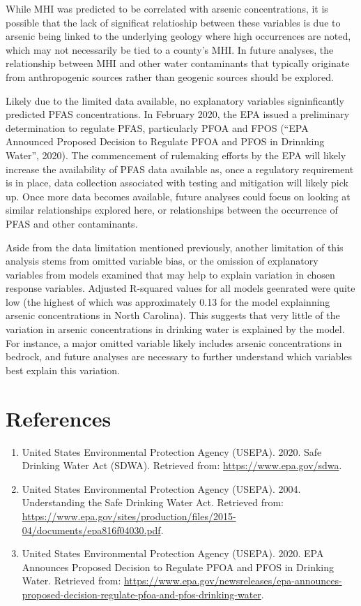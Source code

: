 \documentclass[12pt,]{article}
\providecommand{\tightlist}{%
  \setlength{\itemsep}{0pt}\setlength{\parskip}{0pt}}
\begin{document}
While MHI was predicted to be correlated with arsenic concentrations, it
is possible that the lack of significat relatioship between these
variables is due to arsenic being linked to the underlying geology where
high occurrences are noted, which may not necessarily be tied to a
county's MHI. In future analyses, the relationship between MHI and other
water contaminants that typically originate from anthropogenic sources
rather than geogenic sources should be explored.

Likely due to the limited data available, no explanatory variables
signinficantly predicted PFAS concentrations. In February 2020, the EPA
issued a preliminary determination to regulate PFAS, particularly PFOA
and FPOS (``EPA Announced Proposed Decision to Regulate PFOA and PFOS in
Drinnking Water'', 2020). The commencement of rulemaking efforts by the
EPA will likely increase the availability of PFAS data available as,
once a regulatory requirement is in place, data collection associated
with testing and mitigation will likely pick up. Once more data becomes
available, future analyses could focus on looking at similar
relationships explored here, or relationships between the occurrence of
PFAS and other contaminants.

Aside from the data limitation mentioned previously, another limitation
of this analysis stems from omitted variable bias, or the omission of
explanatory variables from models examined that may help to explain
variation in chosen response variables. Adjusted R-squared values for
all models geenrated were quite low (the highest of which was
approximately 0.13 for the model explainning arsenic concentrations in
North Carolina). This suggests that very little of the variation in
arsenic concentrations in drinking water is explained by the model. For
instance, a major omitted variable likely includes arsenic
concentrations in bedrock, and future analyses are necessary to further
understand which variables best explain this variation.

\newpage

\hypertarget{references}{%
\section{References}\label{references}}

\begin{enumerate}
\def\labelenumi{\arabic{enumi}.}
\tightlist
\item
  United States Environmental Protection Agency (USEPA). 2020. Safe
  Drinking Water Act (SDWA). Retrieved from:
  \url{https://www.epa.gov/sdwa}.
\item
  United States Environmental Protection Agency (USEPA). 2004.
  Understanding the Safe Drinking Water Act. Retrieved from:
  \url{https://www.epa.gov/sites/production/files/2015-04/documents/epa816f04030.pdf}.
\item
  United States Environmental Protection Agency (USEPA). 2020. EPA
  Announces Proposed Decision to Regulate PFOA and PFOS in Drinking
  Water. Retrieved from:
  \url{https://www.epa.gov/newsreleases/epa-announces-proposed-decision-regulate-pfoa-and-pfos-drinking-water}.
\end{enumerate}
\end{document}
